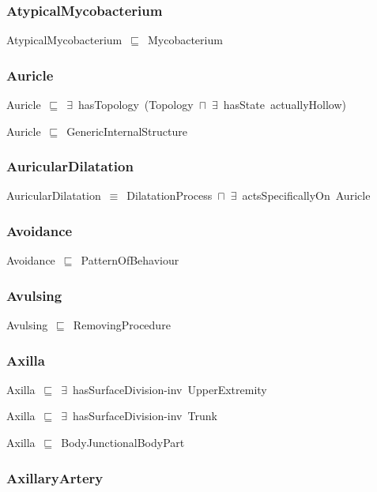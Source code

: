 \documentclass{article}
\begin{document}
\subsubsection*{AtypicalMycobacterium}

AtypicalMycobacterium~\ensuremath{\sqsubseteq}~Mycobacterium~

\subsubsection*{Auricle}

Auricle~\ensuremath{\sqsubseteq}~\ensuremath{\exists}~hasTopology~(Topology~\ensuremath{\sqcap}~\ensuremath{\exists}~hasState~actuallyHollow)~

Auricle~\ensuremath{\sqsubseteq}~GenericInternalStructure~

\subsubsection*{AuricularDilatation}

AuricularDilatation~\ensuremath{\equiv}~DilatationProcess~\ensuremath{\sqcap}~\ensuremath{\exists}~actsSpecificallyOn~Auricle

\subsubsection*{Avoidance}

Avoidance~\ensuremath{\sqsubseteq}~PatternOfBehaviour~

\subsubsection*{Avulsing}

Avulsing~\ensuremath{\sqsubseteq}~RemovingProcedure~

\subsubsection*{Axilla}

Axilla~\ensuremath{\sqsubseteq}~\ensuremath{\exists}~hasSurfaceDivision-inv~UpperExtremity~

Axilla~\ensuremath{\sqsubseteq}~\ensuremath{\exists}~hasSurfaceDivision-inv~Trunk~

Axilla~\ensuremath{\sqsubseteq}~BodyJunctionalBodyPart~

\subsubsection*{AxillaryArtery}
\end{document}
